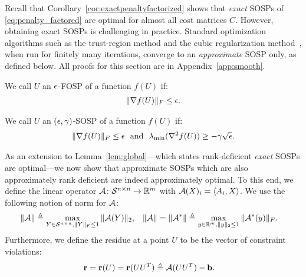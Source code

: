 
Recall that Corollary~\ref{cor:exactpenaltyfactorized} shows that {\em exact} SOSPs of \eqref{eq:penalty_factored} are optimal for almost all cost matrices $C$. However, obtaining exact SOSPs is challenging in practice. Standard optimization algorithms such as the trust-region method and the cubic regularization method~\citep{nesterov2006cubic,cartis2012complexity}, when run for finitely many iterations, converge to an {\em approximate} SOSP only, as defined below. %
All proofs for this section are in Appendix~\ref{app:smooth}.
\begin{definition}
	We call $U$ an $\epsilon$-FOSP of a function $f(U)$ if:
	\begin{align*}
		\| \nabla f(U) \|_F \leq \epsilon.
	\end{align*}
\end{definition}
\begin{definition}
	We call $U$ an $(\epsilon, \gamma)$-SOSP of a function $f(U)$ if:
	\begin{align*}
		\| \nabla f(U) \|_F \leq \epsilon ~~ \text{and} ~~ \lambda_{\min} (\nabla^2 f(U)) \geq -\gamma \sqrt{\epsilon}.
	\end{align*}
\end{definition}
As an extension to Lemma~\ref{lem:global}---which states rank-deficient \emph{exact} SOSPs are optimal---we now show that approximate SOSPs which are also approximately rank deficient are indeed approximately optimal. 
%
To this end, we define the linear operator $\mathcal{A} \colon \mathcal{S}^{n\times n} \to \mathbb{R}^{m}$ with $\mathcal{A}(X)_i = \left\langle A_i, X \right\rangle$. We use the following notion of norm for $\mathcal{A}$:
\begin{align}
	\|\mathcal{A}\| & \triangleq \max_{Y \in \mathcal{S}^{n\times n}, \|Y\|_F \leq 1} \|\mathcal{A}(Y)\|_2, & \|\mathcal{A}\| = \|\mathcal{A}^*\| & \triangleq \max_{y \in \mathbb{R}^{m}, \|y\|_2 \leq 1} \|\mathcal{A}^*(y)\|_F.
	\label{eq:normofA}
\end{align}
Furthermore, we define the residue at a point $U$ to be the vector of constraint violations:
\begin{align}
	\mathbf{r} & = \mathbf{r}(U) = \mathbf{r}(UU^T) \triangleq \mathcal{A}(UU^T) - \mathbf{b}.
	\label{eq:residue}
\end{align}
